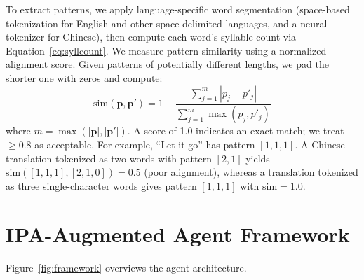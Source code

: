 \documentclass[11pt]{article}
\begin{document}
To extract patterns, we apply language-specific word segmentation (space-based tokenization for English and other space-delimited languages, and a neural tokenizer for Chinese), then compute each word's syllable count via Equation~\ref{eq:syllcount}.
We measure pattern similarity using a normalized alignment score.
Given patterns of potentially different lengths, we pad the shorter one with zeros and compute:
\begin{equation}
    \text{sim}(\mathbf{p}, \mathbf{p}') = 1 - \frac{\sum_{j=1}^{m} |p_j - p'_j|}{\sum_{j=1}^{m} \max(p_j, p'_j)}
    \label{eq:patsim}
\end{equation}
where $m = \max(|\mathbf{p}|, |\mathbf{p}'|)$.
A score of 1.0 indicates an exact match; we treat $\geq 0.8$ as acceptable.
For example, ``Let it go'' has pattern $[1, 1, 1]$.
A Chinese translation tokenized as two words with pattern $[2, 1]$ yields $\text{sim}([1,1,1], [2,1,0]) = 0.5$ (poor alignment), whereas a translation tokenized as three single-character words gives pattern $[1, 1, 1]$ with $\text{sim} = 1.0$.

\section{IPA-Augmented Agent Framework}
\label{sec:framework}

Figure~\ref{fig:framework} overviews the agent architecture.
\end{document}
